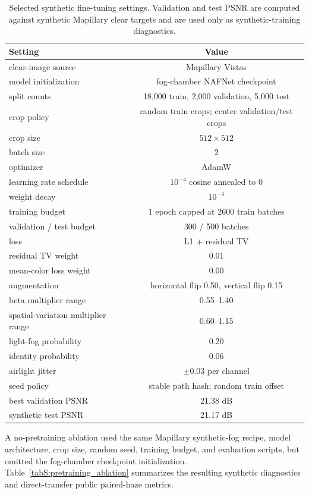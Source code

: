 \documentclass[9pt]{osa-supplemental-document}
\begin{document}
\begin{table}[htbp]
\centering
\small
\caption{Selected synthetic fine-tuning settings. Validation and test PSNR are computed against synthetic Mapillary clear targets and are used only as synthetic-training diagnostics.}
\label{tabS:spatial_synth_training}
\begin{tabular}{lc}
\toprule
\textbf{Setting} & \textbf{Value} \\
\midrule
clear-image source & Mapillary Vistas \\
model initialization & fog-chamber NAFNet checkpoint \\
split counts & 18{,}000 train, 2{,}000 validation, 5{,}000 test \\
crop policy & random train crops; center validation/test crops \\
crop size & $512 \times 512$ \\
batch size & 2 \\
optimizer & AdamW \\
learning rate schedule & $10^{-4}$ cosine annealed to 0 \\
weight decay & $10^{-4}$ \\
training budget & 1 epoch capped at 2600 train batches \\
validation / test budget & 300 / 500 batches \\
loss & L1 + residual TV \\
residual TV weight & 0.01 \\
mean-color loss weight & 0.00 \\
augmentation & horizontal flip 0.50, vertical flip 0.15 \\
beta multiplier range & 0.55--1.40 \\
spatial-variation multiplier range & 0.60--1.15 \\
light-fog probability & 0.20 \\
identity probability & 0.06 \\
airlight jitter & $\pm 0.03$ per channel \\
seed policy & stable path hash; random train offset \\
best validation PSNR & 21.38 dB \\
synthetic test PSNR & 21.17 dB \\
\bottomrule
\end{tabular}
\end{table}

A no-pretraining ablation used the same Mapillary synthetic-fog recipe, model architecture, crop size, random seed, training budget, and evaluation scripts, but omitted the fog-chamber checkpoint initialization. Table~\ref{tabS:pretraining_ablation} summarizes the resulting synthetic diagnostics and direct-transfer public paired-haze metrics.
\end{document}
